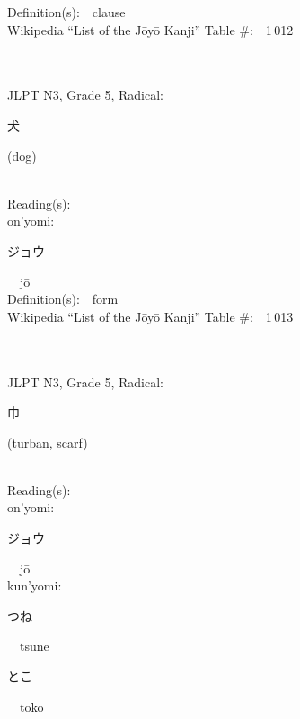 \begin{multicols}{2}
Definition(s):\ \ clause \\
Wikipedia ``List of the J\=oy\=o Kanji'' Table \#:\ \ 1\,012 \\
\ \ \\
{\fontsize{34pt}{40pt}  }\ \ \\  %
{JLPT N3, Grade 5, Radical:\ \ {\begin{CJK}{UTF8}{min} 犬 \end{CJK}} (dog) } \\
Reading(s):\ \ \\
{\hspace*{1em}}on'yomi:\ \ \\
{\hspace*{2em}}{\begin{CJK}{UTF8}{min} ジョウ \end{CJK}}\ \ j\=o\ \ \\
Definition(s):\ \ form \\
Wikipedia ``List of the J\=oy\=o Kanji'' Table \#:\ \ 1\,013 \\
\ \ \\
{\fontsize{34pt}{40pt}  }\ \ \\  %
{JLPT N3, Grade 5, Radical:\ \ {\begin{CJK}{UTF8}{min} 巾 \end{CJK}} (turban, scarf) } \\
Reading(s):\ \ \\
{\hspace*{1em}}on'yomi:\ \ \\
{\hspace*{2em}}{\begin{CJK}{UTF8}{min} ジョウ \end{CJK}}\ \ j\=o\ \ \\
{\hspace*{1em}}kun'yomi:\ \ \\
{\hspace*{2em}}{\begin{CJK}{UTF8}{min} つね \end{CJK}}\ \ tsune\ \ \\
{\hspace*{2em}}{\begin{CJK}{UTF8}{min} とこ \end{CJK}}\ \ toko\ \ \\

\end{multicols}
